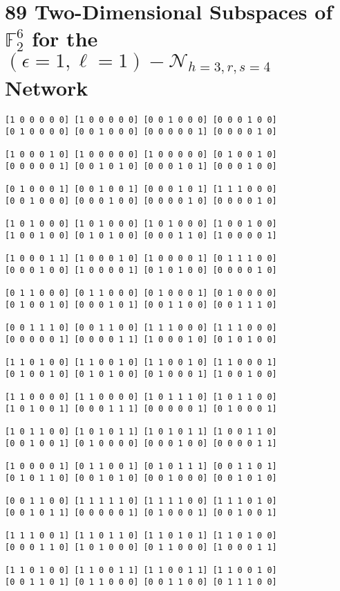 \section{89 Two-Dimensional Subspaces of $\ensuremath{\mathbb{F}}_{2}^{6}$
for the $\left(\epsilon=1,\ell=1\right)-\mathcal{N}_{h=3,r,s=4}$
Network \label{sec:89-Two-Dimensional-Subspaces}}

\begin{lstlisting}
[1 0 0 0 0 0] [1 0 0 0 0 0] [0 0 1 0 0 0] [0 0 0 1 0 0] 
[0 1 0 0 0 0] [0 0 1 0 0 0] [0 0 0 0 0 1] [0 0 0 0 1 0] 

[1 0 0 0 1 0] [1 0 0 0 0 0] [1 0 0 0 0 0] [0 1 0 0 1 0] 
[0 0 0 0 0 1] [0 0 1 0 1 0] [0 0 0 1 0 1] [0 0 0 1 0 0] 

[0 1 0 0 0 1] [0 0 1 0 0 1] [0 0 0 1 0 1] [1 1 1 0 0 0] 
[0 0 1 0 0 0] [0 0 0 1 0 0] [0 0 0 0 1 0] [0 0 0 0 1 0] 

[1 0 1 0 0 0] [1 0 1 0 0 0] [1 0 1 0 0 0] [1 0 0 1 0 0] 
[1 0 0 1 0 0] [0 1 0 1 0 0] [0 0 0 1 1 0] [1 0 0 0 0 1] 

[1 0 0 0 1 1] [1 0 0 0 1 0] [1 0 0 0 0 1] [0 1 1 1 0 0] 
[0 0 0 1 0 0] [1 0 0 0 0 1] [0 1 0 1 0 0] [0 0 0 0 1 0] 

[0 1 1 0 0 0] [0 1 1 0 0 0] [0 1 0 0 0 1] [0 1 0 0 0 0] 
[0 1 0 0 1 0] [0 0 0 1 0 1] [0 0 1 1 0 0] [0 0 1 1 1 0] 

[0 0 1 1 1 0] [0 0 1 1 0 0] [1 1 1 0 0 0] [1 1 1 0 0 0] 
[0 0 0 0 0 1] [0 0 0 0 1 1] [1 0 0 0 1 0] [0 1 0 1 0 0] 

[1 1 0 1 0 0] [1 1 0 0 1 0] [1 1 0 0 1 0] [1 1 0 0 0 1] 
[0 1 0 0 1 0] [0 1 0 1 0 0] [0 1 0 0 0 1] [1 0 0 1 0 0] 

[1 1 0 0 0 0] [1 1 0 0 0 0] [1 0 1 1 1 0] [1 0 1 1 0 0] 
[1 0 1 0 0 1] [0 0 0 1 1 1] [0 0 0 0 0 1] [0 1 0 0 0 1] 

[1 0 1 1 0 0] [1 0 1 0 1 1] [1 0 1 0 1 1] [1 0 0 1 1 0] 
[0 0 1 0 0 1] [0 1 0 0 0 0] [0 0 0 1 0 0] [0 0 0 0 1 1] 

[1 0 0 0 0 1] [0 1 1 0 0 1] [0 1 0 1 1 1] [0 0 1 1 0 1] 
[0 1 0 1 1 0] [0 0 1 0 1 0] [0 0 1 0 0 0] [0 0 1 0 1 0] 

[0 0 1 1 0 0] [1 1 1 1 1 0] [1 1 1 1 0 0] [1 1 1 0 1 0] 
[0 0 1 0 1 1] [0 0 0 0 0 1] [0 1 0 0 0 1] [0 0 1 0 0 1] 

[1 1 1 0 0 1] [1 1 0 1 1 0] [1 1 0 1 0 1] [1 1 0 1 0 0] 
[0 0 0 1 1 0] [1 0 1 0 0 0] [0 1 1 0 0 0] [1 0 0 0 1 1] 

[1 1 0 1 0 0] [1 1 0 0 1 1] [1 1 0 0 1 1] [1 1 0 0 1 0] 
[0 0 1 1 0 1] [0 1 1 0 0 0] [0 0 1 1 0 0] [0 1 1 1 0 0] 


\end{lstlisting}
